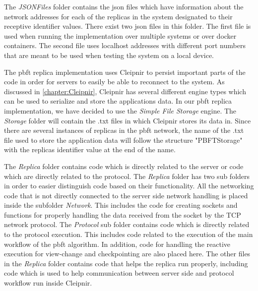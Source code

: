 The \emph{JSONFiles} folder contains the \ac{json} files which have information about the network addresses for each of the replicas in the system designated to their receptive identifier values. There exist two \ac{json} files in this folder. The first file is used when running the implementation over multiple systems or over docker containers. The second file uses localhost addresses with different port numbers that are meant to be used when testing the system on a local device.

The \ac{pbft} replica implementation uses Cleipnir to persist important parts of the code in order for servers to easily be able to reconnect to the system. As discussed in \autoref{chapter:Cleipnir}, Cleipnir has several different engine types which can be used to serialize and store the applications data. In our \ac{pbft} replica implementation, we have decided to use the \emph{Simple File Storage} engine. The \emph{Storage} folder will contain the .txt files in which Cleipnir stores its data in. Since there are several instances of replicas in the \ac{pbft} network, the name of the .txt file used to store the application data will follow the structure "PBFTStorage" with the replicas identifier value at the end of the name.

The \emph{Replica} folder contains code which is directly related to the server or code which are directly related to the protocol. The \emph{Replica} folder has two sub folders in order to easier distinguish code based on their functionality. All the networking code that is not directly connected to the server side network handling is placed inside the subfolder \emph{Network}. This includes the code for creating sockets and functions for properly handling the data received from the socket by the TCP network protocol.
The \emph{Protocol} sub folder contains code which is directly related to the protocol execution. This includes code related to the execution of the main workflow of the \ac{pbft} algorithm. In addition, code for handling the reactive execution for view-change and checkpointing are also placed here.
The other files in the \emph{Replica} folder contains code that helps the replica run properly, including code which is used to help communication between server side and protocol workflow run inside Cleipnir.

